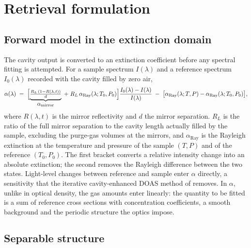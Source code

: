 \section{Retrieval formulation}
\label{sec:2}

\subsection{Forward model in the extinction domain}
\label{sec:2.1}

The cavity output is converted to an extinction coefficient before any spectral fitting
is attempted. For a sample spectrum $I(\lambda)$ and a reference spectrum
$I_0(\lambda)$ recorded with the cavity filled by zero air,
\begin{equation}
\alpha(\lambda) \;=\;
\Bigl[\underbrace{\tfrac{R_L\,(1-R(\lambda,t))}{d}}_{\textstyle \alpha_{\mathrm{mirror}}}
\;+\; R_L\,\alpha_{\mathrm{Ray}}(\lambda; T_0, P_0)\Bigr]
\frac{I_0(\lambda)-I(\lambda)}{I(\lambda)}
\;-\;\bigl[\alpha_{\mathrm{Ray}}(\lambda; T, P)-\alpha_{\mathrm{Ray}}(\lambda; T_0,P_0)\bigr],
\label{eq:1}
\end{equation}
where $R(\lambda,t)$ is the mirror reflectivity and $d$ the mirror separation. $R_L$ is the ratio of the full mirror
separation to the cavity length actually filled by the sample, excluding the purge-gas volumes at the mirrors, and
$\alpha_{\mathrm{Ray}}$ is the Rayleigh extinction at the temperature and pressure of the sample $(T,P)$ and of the
reference $(T_0,P_0)$. The first bracket converts a relative
intensity change into an absolute extinction; the second removes the Rayleigh difference between the two states. Light-level changes between reference and sample enter $\alpha$ directly, a sensitivity that the iterative
cavity-enhanced DOAS method of \citet{Horbanski_2019} removes.
In $\alpha$, unlike in optical density, the gas amounts enter linearly: the quantity to be fitted is a sum of
reference cross sections with concentration coefficients, a smooth background and the periodic structure the
optics impose.

\subsection{Separable structure}
\label{sec:2.2}

